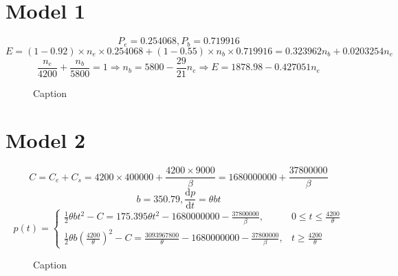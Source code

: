 \documentclass{ctexart}
\begin{document}
\section{Model 1}

$$
P_e = 0.254068, P_b = 0.719916
$$
$$
E = (1 - 0.92) \times n_e \times 0.254068 + (1 - 0.55) \times n_b \times 0.719916 = 0.323962n_b + 0.0203254n_e
$$
$$
\frac{n_e}{4200} + \frac{n_b}{5800} = 1
\Rightarrow n_b = 5800 - \frac{29}{21}n_e
\Rightarrow E = 1878.98 - 0.427051n_e
$$

\begin{figure}[htb]
	\centering
	\caption{Caption}
\end{figure}

\section{Model 2}

$$
C = C_e + C_s = 4200 \times 400000 + \frac{4200 \times 9000}{\beta} = 1680000000 + \frac{37800000}{\beta}
$$
$$
b = 350.79, \frac{\mathrm{d}p}{\mathrm{d}t} = \theta bt
$$
$$
p(t) = 
\begin{cases}
 	\frac12 \theta bt^2 - C = 175.395\theta t^2 - 1680000000 - \frac{37800000}{\beta}, & 0 \le t \le \frac{4200}{\theta}\\
	\frac12 \theta b(\frac{4200}{\theta})^2 - C = \frac{3093967800}{\theta} - 1680000000 - \frac{37800000}{\beta}, & t \ge \frac{4200}{\theta}
\end{cases}
$$

\begin{figure}[htb]
	\centering
	\begin{tikzpicture}
		
	\end{tikzpicture}
	\caption{Caption}
\end{figure}
\end{document}
